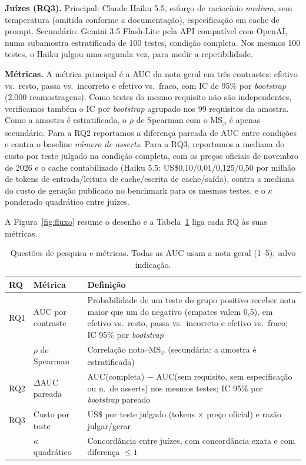 \documentclass[sigconf,nonacm]{acmart}
\newcommand{\msphi}{MS$_\varphi$}
\begin{document}
\textbf{Juízes (RQ3).} Principal: Claude Haiku 5.5, esforço de raciocínio \emph{medium}, sem temperatura
(omitida conforme a documentação), especificação em cache de prompt. Secundário: Gemini 3.5 Flash-Lite pela
API compatível com OpenAI, numa subamostra estratificada de 100 testes, condição completa. Nos mesmos 100 testes, o Haiku julgou uma
segunda vez, para medir a repetibilidade.

\textbf{Métricas.} A métrica principal é a AUC da nota geral em três contrastes: efetivo vs.\ resto, passa
vs.\ incorreto e efetivo vs.\ fraco, com IC de 95\% por \emph{bootstrap} (2.000 reamostragens). Como testes do mesmo requisito
não são independentes, verificamos também o IC por \emph{bootstrap} agrupado nos 99 requisitos da amostra. Como a
amostra é estratificada, o $\rho$ de Spearman com o \msphi{} é apenas secundário. Para a RQ2 reportamos a
diferença pareada de AUC entre condições e contra o baseline \emph{número de asserts}. Para a RQ3,
reportamos a mediana do custo por teste julgado na condição completa, com os preços oficiais de novembro de
2026 e o cache contabilizado (Haiku 5.5: US\$0,10/0,01/0,125/0,50
por milhão de tokens de entrada/leitura de cache/escrita de cache/saída), contra a mediana do custo de geração publicado
no benchmark para os mesmos testes, e o $\kappa$ ponderado quadrático entre juízes.

A Figura~\ref{fig:fluxo} resume o desenho e a Tabela~\ref{tab:metricas} liga cada RQ às suas métricas.

\begin{table}[t]
\caption{Questões de pesquisa e métricas. Todas as AUC usam a nota geral (1--5), salvo indicação.}
\label{tab:metricas}
\small
\begin{tabular}{@{}p{}p{}p{}@{}}
\toprule
\textbf{RQ} & \textbf{Métrica} & \textbf{Definição} \\
\midrule
RQ1 & AUC por contraste & Probabilidade de um teste do grupo positivo receber nota maior que um do negativo
  (empates valem 0,5), em efetivo vs.\ resto, passa vs.\ incorreto e efetivo vs.\ fraco; IC 95\% por
  \emph{bootstrap} \\
    & $\rho$ de Spearman & Correlação nota--\msphi{} (secundária: a amostra é estratificada) \\
\midrule
RQ2 & $\Delta$AUC pareada & AUC(completa) $-$ AUC(sem requisito, sem especificação ou n.\ de asserts) nos
  mesmos testes; IC 95\% por \emph{bootstrap} pareado \\
\midrule
RQ3 & Custo por teste & US\$ por teste julgado (tokens $\times$ preço oficial) e razão julgar/gerar \\
    & $\kappa$ quadrático & Concordância entre juízes, com concordância exata e com diferença $\le 1$ \\
\bottomrule
\end{tabular}
\end{table}
\end{document}
